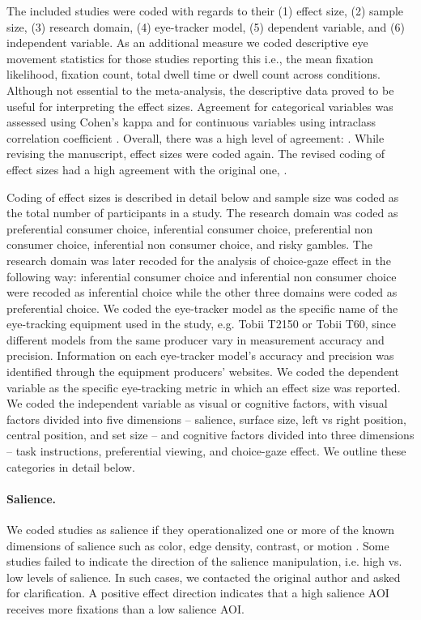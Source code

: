 The included studies were coded with regards to their (1) effect size, (2) sample size, (3) research domain, (4) eye-tracker model, (5) dependent variable, and (6) independent variable. As an additional measure we coded descriptive eye movement statistics for those studies reporting this i.e., the mean fixation likelihood, fixation count, total dwell time or dwell count across conditions. Although not essential to the meta-analysis, the descriptive data proved to be useful for interpreting the effect sizes. Agreement for categorical variables was assessed using Cohen's kappa and for continuous variables using intraclass correlation coefficient \citep{shrout1979a}. Overall, there was a high level of agreement: . While revising the manuscript, effect sizes were coded again. The revised coding of effect sizes had a high agreement with the original one,  \unskip.

Coding of effect sizes is described in detail below and sample size was coded as the total number of participants in a study. The research domain was coded as preferential consumer choice, inferential consumer choice, preferential non consumer choice, inferential non consumer choice, and risky gambles. The research domain was later recoded for the analysis of choice-gaze effect in the following way: inferential consumer choice and inferential non consumer choice were recoded as inferential choice while the other three domains were coded as preferential choice. We coded the eye-tracker model as the specific name of the eye-tracking equipment used in the study, e.g. Tobii T2150 or Tobii T60, since different models from the same producer vary in measurement accuracy and precision. Information on each eye-tracker model's accuracy and precision was identified through the equipment producers' websites. We coded the dependent variable as the specific eye-tracking metric in which an effect size was reported. We coded the independent variable as visual or cognitive factors, with visual factors divided into five dimensions -- salience, surface size, left vs right position, central position, and set size -- and cognitive factors divided into three dimensions -- task instructions, preferential viewing, and choice-gaze effect. We outline these categories in detail below. 

\paragraph{Salience.} We coded studies as salience if they operationalized one or more of the known dimensions of salience such as color, edge density, contrast, or motion \citep{itti2000}. Some studies failed to indicate the direction of the salience manipulation, i.e. high vs. low levels of salience. In such cases, we contacted the original author and asked for clarification. A positive effect direction indicates that a high salience AOI receives more fixations than a low salience AOI.

